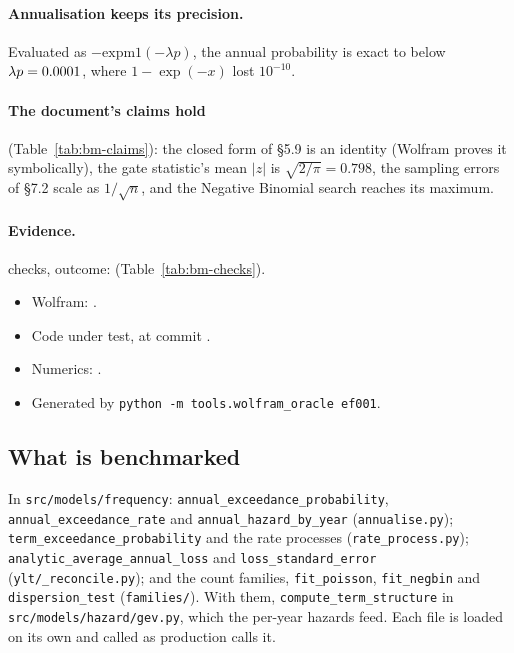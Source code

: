\documentclass[11pt,a4paper]{article}
\begin{document}
\paragraph{Annualisation keeps its precision.} Evaluated as $-\mathrm{expm1}(-\lambda p)$,
the annual probability is exact to \bmPrecision{} below $\lambda p=0.0001$,
where $1-\exp(-x)$ lost $10^{-10}$.

\paragraph{The document's claims hold} (Table~\ref{tab:bm-claims}): the closed form
of \S5.9 is an identity (Wolfram proves it symbolically), the gate statistic's mean
$|z|$ is $\sqrt{2/\pi}=0.798$, the sampling errors of \S7.2 scale as $1/\sqrt n$, and
the Negative Binomial search reaches its maximum.

\paragraph{Evidence.} \bmChecks{} checks, outcome: \bmOutcome{}
(Table~\ref{tab:bm-checks}).
\begin{itemize}[leftmargin=*,nosep]
\item Wolfram: \bmWolfram{}\bmWolframVia.
\item Code under test, at commit \bmCodeCommit{}\bmCodeDirty.
\item Numerics: \bmNumerics.
\item Generated \bmGenerated{} by \texttt{python -m tools.wolfram\_oracle ef001}.
\end{itemize}

\mkmpurpose

\subsection{What is benchmarked}
In \texttt{src/models/frequency}: \texttt{annual\_exceedance\_probability},
\texttt{annual\_exceedance\_rate} and \texttt{annual\_hazard\_by\_year}
(\texttt{annualise.py}); \texttt{term\_exceedance\_probability} and the rate
processes (\texttt{rate\_process.py}); \texttt{analytic\_average\_annual\_loss} and
\texttt{loss\_standard\_error} (\texttt{ylt/\_reconcile.py}); and the count
families, \texttt{fit\_poisson}, \texttt{fit\_negbin} and \texttt{dispersion\_test}
(\texttt{families/}). With them, \texttt{compute\_term\_structure} in
\texttt{src/models/hazard/gev.py}, which the per-year hazards feed. Each file is
loaded on its own and called as production calls it.
\end{document}
